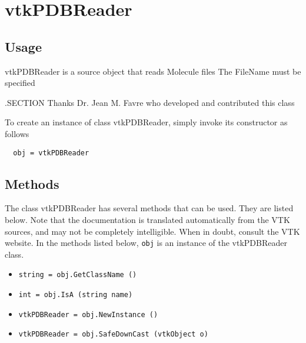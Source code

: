 \section{vtkPDBReader}

\subsection{Usage}

 vtkPDBReader is a source object that reads Molecule files
 The FileName must be specified

 .SECTION Thanks
 Dr. Jean M. Favre who developed and contributed this class

To create an instance of class vtkPDBReader, simply
invoke its constructor as follows
\begin{verbatim}
  obj = vtkPDBReader
\end{verbatim}
\subsection{Methods}

The class vtkPDBReader has several methods that can be used.
  They are listed below.
Note that the documentation is translated automatically from the VTK sources,
and may not be completely intelligible.  When in doubt, consult the VTK website.
In the methods listed below, \verb|obj| is an instance of the vtkPDBReader class.
\begin{itemize}
\item  \verb|string = obj.GetClassName ()|

\item  \verb|int = obj.IsA (string name)|

\item  \verb|vtkPDBReader = obj.NewInstance ()|

\item  \verb|vtkPDBReader = obj.SafeDownCast (vtkObject o)|

\end{itemize}
